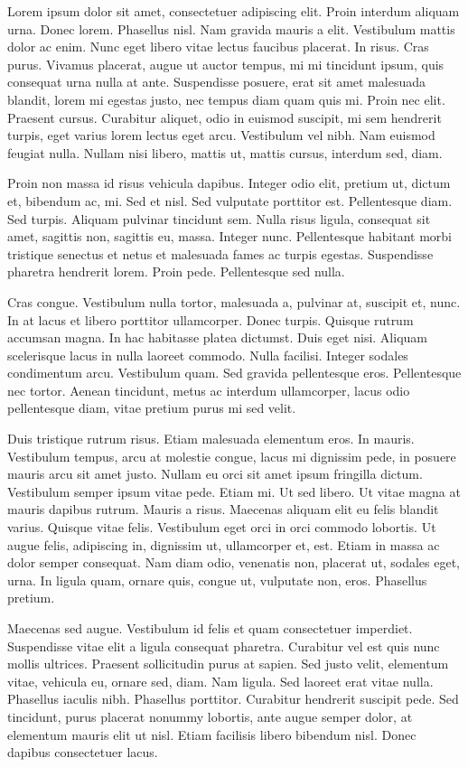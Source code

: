 Lorem ipsum dolor sit amet, consectetuer adipiscing elit. Proin interdum aliquam urna. Donec lorem. Phasellus nisl. Nam gravida mauris a elit. Vestibulum mattis dolor ac enim. Nunc eget libero vitae lectus faucibus placerat. In risus. Cras purus. Vivamus placerat, augue ut auctor tempus, mi mi tincidunt ipsum, quis consequat urna nulla at ante. Suspendisse posuere, erat sit amet malesuada blandit, lorem mi egestas justo, nec tempus diam quam quis mi. Proin nec elit. Praesent cursus. Curabitur aliquet, odio in euismod suscipit, mi sem hendrerit turpis, eget varius lorem lectus eget arcu. Vestibulum vel nibh. Nam euismod feugiat nulla. Nullam nisi libero, mattis ut, mattis cursus, interdum sed, diam.

Proin non massa id risus vehicula dapibus. Integer odio elit, pretium ut, dictum et, bibendum ac, mi. Sed et nisl. Sed vulputate porttitor est. Pellentesque diam. Sed turpis. Aliquam pulvinar tincidunt sem. Nulla risus ligula, consequat sit amet, sagittis non, sagittis eu, massa. Integer nunc. Pellentesque habitant morbi tristique senectus et netus et malesuada fames ac turpis egestas. Suspendisse pharetra hendrerit lorem. Proin pede. Pellentesque sed nulla.

Cras congue. Vestibulum nulla tortor, malesuada a, pulvinar at, suscipit et, nunc. In at lacus et libero porttitor ullamcorper. Donec turpis. Quisque rutrum accumsan magna. In hac habitasse platea dictumst. Duis eget nisi. Aliquam scelerisque lacus in nulla laoreet commodo. Nulla facilisi. Integer sodales condimentum arcu. Vestibulum quam. Sed gravida pellentesque eros. Pellentesque nec tortor. Aenean tincidunt, metus ac interdum ullamcorper, lacus odio pellentesque diam, vitae pretium purus mi sed velit.

Duis tristique rutrum risus. Etiam malesuada elementum eros. In mauris. Vestibulum tempus, arcu at molestie congue, lacus mi dignissim pede, in posuere mauris arcu sit amet justo. Nullam eu orci sit amet ipsum fringilla dictum. Vestibulum semper ipsum vitae pede. Etiam mi. Ut sed libero. Ut vitae magna at mauris dapibus rutrum. Mauris a risus. Maecenas aliquam elit eu felis blandit varius. Quisque vitae felis. Vestibulum eget orci in orci commodo lobortis. Ut augue felis, adipiscing in, dignissim ut, ullamcorper et, est. Etiam in massa ac dolor semper consequat. Nam diam odio, venenatis non, placerat ut, sodales eget, urna. In ligula quam, ornare quis, congue ut, vulputate non, eros. Phasellus pretium.

Maecenas sed augue. Vestibulum id felis et quam consectetuer imperdiet. Suspendisse vitae elit a ligula consequat pharetra. Curabitur vel est quis nunc mollis ultrices. Praesent sollicitudin purus at sapien. Sed justo velit, elementum vitae, vehicula eu, ornare sed, diam. Nam ligula. Sed laoreet erat vitae nulla. Phasellus iaculis nibh. Phasellus porttitor. Curabitur hendrerit suscipit pede. Sed tincidunt, purus placerat nonummy lobortis, ante augue semper dolor, at elementum mauris elit ut nisl. Etiam facilisis libero bibendum nisl. Donec dapibus consectetuer lacus.

